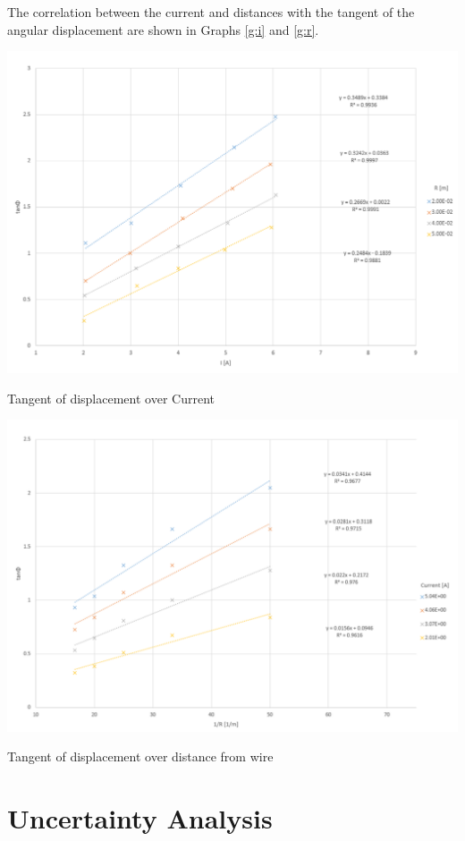 \documentclass{article}
\begin{document}
The correlation between the current and distances with the tangent of the angular displacement are shown in Graphs \ref{g:i} and \ref{g:r}.

\begin{graph}[H]
  \includegraphics[width=\linewidth]{img/graph_i.pdf}
  \caption{Tangent of displacement over Current}
  \label{g:i}
\end{graph}

\begin{graph}[H]
  \includegraphics[width=\linewidth]{img/graph_r.pdf}
  \caption{Tangent of displacement over distance from wire}
  \label{g:r}
\end{graph}

\section{Uncertainty Analysis}
\end{document}
